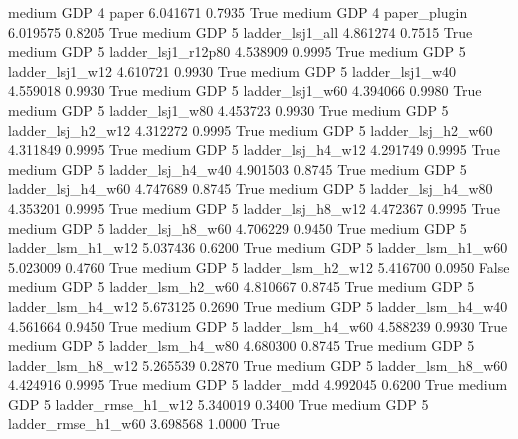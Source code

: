     medium      GDP                 4                  paper   6.041671      0.7935    True
    medium      GDP                 4           paper_plugin   6.019575      0.8205    True
    medium      GDP                 5        ladder_lsj1_all   4.861274      0.7515    True
    medium      GDP                 5     ladder_lsj1_r12p80   4.538909      0.9995    True
    medium      GDP                 5        ladder_lsj1_w12   4.610721      0.9930    True
    medium      GDP                 5        ladder_lsj1_w40   4.559018      0.9930    True
    medium      GDP                 5        ladder_lsj1_w60   4.394066      0.9980    True
    medium      GDP                 5        ladder_lsj1_w80   4.453723      0.9930    True
    medium      GDP                 5      ladder_lsj_h2_w12   4.312272      0.9995    True
    medium      GDP                 5      ladder_lsj_h2_w60   4.311849      0.9995    True
    medium      GDP                 5      ladder_lsj_h4_w12   4.291749      0.9995    True
    medium      GDP                 5      ladder_lsj_h4_w40   4.901503      0.8745    True
    medium      GDP                 5      ladder_lsj_h4_w60   4.747689      0.8745    True
    medium      GDP                 5      ladder_lsj_h4_w80   4.353201      0.9995    True
    medium      GDP                 5      ladder_lsj_h8_w12   4.472367      0.9995    True
    medium      GDP                 5      ladder_lsj_h8_w60   4.706229      0.9450    True
    medium      GDP                 5      ladder_lsm_h1_w12   5.037436      0.6200    True
    medium      GDP                 5      ladder_lsm_h1_w60   5.023009      0.4760    True
    medium      GDP                 5      ladder_lsm_h2_w12   5.416700      0.0950   False
    medium      GDP                 5      ladder_lsm_h2_w60   4.810667      0.8745    True
    medium      GDP                 5      ladder_lsm_h4_w12   5.673125      0.2690    True
    medium      GDP                 5      ladder_lsm_h4_w40   4.561664      0.9450    True
    medium      GDP                 5      ladder_lsm_h4_w60   4.588239      0.9930    True
    medium      GDP                 5      ladder_lsm_h4_w80   4.680300      0.8745    True
    medium      GDP                 5      ladder_lsm_h8_w12   5.265539      0.2870    True
    medium      GDP                 5      ladder_lsm_h8_w60   4.424916      0.9995    True
    medium      GDP                 5             ladder_mdd   4.992045      0.6200    True
    medium      GDP                 5     ladder_rmse_h1_w12   5.340019      0.3400    True
    medium      GDP                 5     ladder_rmse_h1_w60   3.698568      1.0000    True
